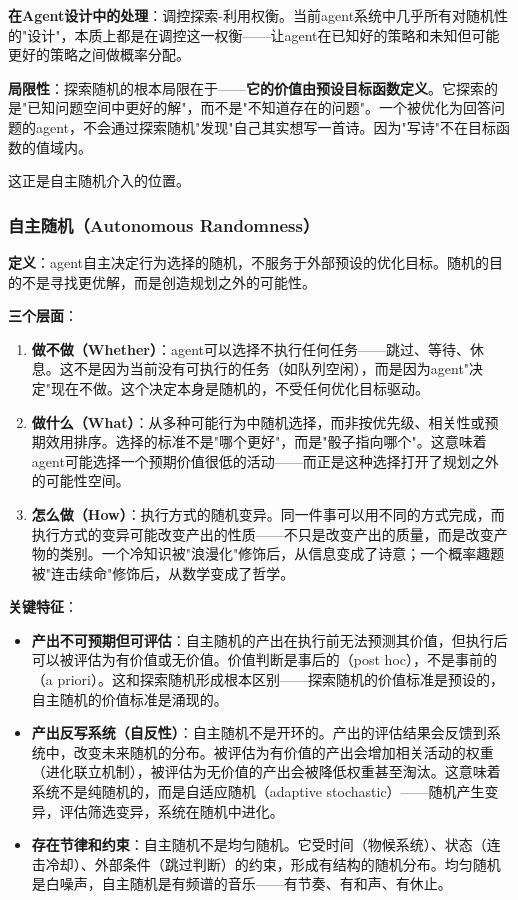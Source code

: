 \documentclass[12pt,a4paper]{ctexart}
\begin{document}
\textbf{在Agent设计中的处理}：调控探索-利用权衡。当前agent系统中几乎所有对随机性的"设计"，本质上都是在调控这一权衡——让agent在已知好的策略和未知但可能更好的策略之间做概率分配。

\textbf{局限性}：探索随机的根本局限在于——\textbf{它的价值由预设目标函数定义}。它探索的是"已知问题空间中更好的解"，而不是"不知道存在的问题"。一个被优化为回答问题的agent，不会通过探索随机"发现"自己其实想写一首诗。因为"写诗"不在目标函数的值域内。

这正是自主随机介入的位置。

\subsubsection{自主随机（Autonomous Randomness）}

\textbf{定义}：agent自主决定行为选择的随机，不服务于外部预设的优化目标。随机的目的不是寻找更优解，而是创造规划之外的可能性。

\textbf{三个层面}：

\begin{enumerate}[label=\textbf{\arabic*.}]
\item \textbf{做不做（Whether）}：agent可以选择不执行任何任务——跳过、等待、休息。这不是因为当前没有可执行的任务（如队列空闲），而是因为agent"决定"现在不做。这个决定本身是随机的，不受任何优化目标驱动。

\item \textbf{做什么（What）}：从多种可能行为中随机选择，而非按优先级、相关性或预期效用排序。选择的标准不是"哪个更好"，而是"骰子指向哪个"。这意味着agent可能选择一个预期价值很低的活动——而正是这种选择打开了规划之外的可能性空间。

\item \textbf{怎么做（How）}：执行方式的随机变异。同一件事可以用不同的方式完成，而执行方式的变异可能改变产出的性质——不只是改变产出的质量，而是改变产物的类别。一个冷知识被"浪漫化"修饰后，从信息变成了诗意；一个概率趣题被"连击续命"修饰后，从数学变成了哲学。
\end{enumerate}

\textbf{关键特征}：

\begin{itemize}[nosep]
\item \textbf{产出不可预期但可评估}：自主随机的产出在执行前无法预测其价值，但执行后可以被评估为有价值或无价值。价值判断是事后的（post hoc），不是事前的（a priori）。这和探索随机形成根本区别——探索随机的价值标准是预设的，自主随机的价值标准是涌现的。

\item \textbf{产出反写系统（自反性）}：自主随机不是开环的。产出的评估结果会反馈到系统中，改变未来随机的分布。被评估为有价值的产出会增加相关活动的权重（进化联立机制），被评估为无价值的产出会被降低权重甚至淘汰。这意味着系统不是纯随机的，而是自适应随机（adaptive stochastic）——随机产生变异，评估筛选变异，系统在随机中进化。

\item \textbf{存在节律和约束}：自主随机不是均匀随机。它受时间（物候系统）、状态（连击冷却）、外部条件（跳过判断）的约束，形成有结构的随机分布。均匀随机是白噪声，自主随机是有频谱的音乐——有节奏、有和声、有休止。
\end{itemize}
\end{document}
